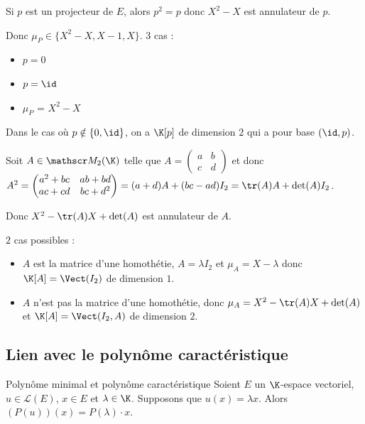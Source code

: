 \begin{exemple}
    Si $p$ est un projecteur de $E$, alors $p^2 = p$ donc $X^2 - X$ est annulateur de $p$.

    Donc $\mu_P \in \{X^2 - X, X - 1, X\}$. 3 cas : 
    \begin{itemize}
        \item $p = 0$
        \item $p = \id$
        \item $\mu_P$ = $X^2 - X$ 
    \end{itemize}

    Dans le cas où $p \notin \{0, \id\}$, on a $\K[p]$ de dimension $2$ qui a pour base $(\id, p)$.

    \lvspace Soit $A \in \mathscr M_2(\K)$ telle que $A = \begin{pmatrix}
        a & b \\
        c & d
    \end{pmatrix}$ et donc $A^2 = \begin{pmatrix}
        a^2 + bc & ab + bd \\
        ac + cd & bc + d^2
    \end{pmatrix} = (a + d) A  + (b c - ad) I_2 = \tr(A) A + \det(A) I_2$.

    Donc $X^2 - \tr(A) X + \det(A)$ est annulateur de $A$.

    $2$ cas possibles : 
    \begin{itemize}
        \item $A$ est la matrice d'une homothétie, $A = \lambda I_2$ et $\mu_A = X - \lambda$ donc 
        $\K[A] = \Vect(I_2)$ de dimension $1$.
        \item $A$ n'est pas la matrice d'une homothétie, donc $\mu_A = X^2 - \tr(A) X + \det(A)$ et 
        $\K[A] = \Vect(I_2, A)$ de dimension $2$.
    \end{itemize}
\end{exemple}

\subsection{Lien avec le polynôme caractéristique}

\begin{proposition}{Polynôme minimal et polynôme caractéristique}{}
    Soient $E$ un $\K$-espace vectoriel, $u \in \mathscr L(E)$, $x \in E$ et 
    $\lambda \in \K$. Supposons que $u(x) = \lambda x$. Alors $(P(u))(x) = P(\lambda)\cdot x$.
\end{proposition}

